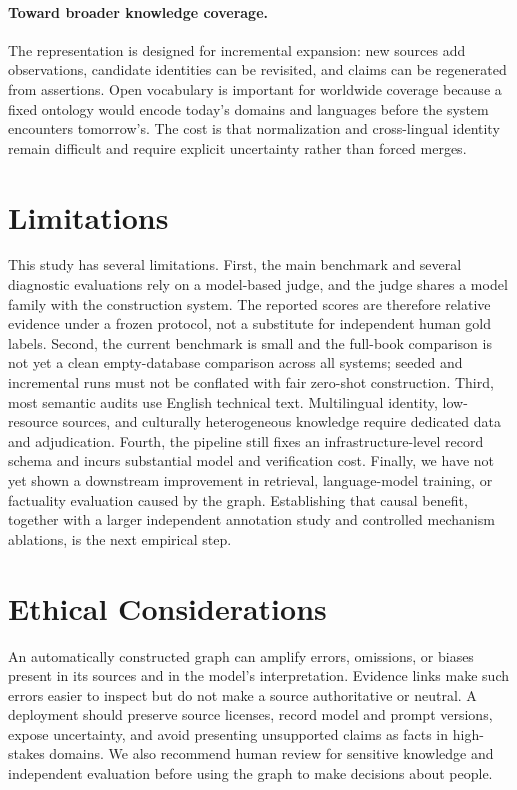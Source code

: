 \documentclass[11pt]{article}
\begin{document}
\paragraph{Toward broader knowledge coverage.} The representation is designed for incremental expansion: new sources add observations, candidate identities can be revisited, and claims can be regenerated from assertions. Open vocabulary is important for worldwide coverage because a fixed ontology would encode today's domains and languages before the system encounters tomorrow's. The cost is that normalization and cross-lingual identity remain difficult and require explicit uncertainty rather than forced merges.

\section{Limitations}
\label{sec:limitations}

This study has several limitations. First, the main benchmark and several diagnostic evaluations rely on a model-based judge, and the judge shares a model family with the construction system. The reported scores are therefore relative evidence under a frozen protocol, not a substitute for independent human gold labels. Second, the current benchmark is small and the full-book comparison is not yet a clean empty-database comparison across all systems; seeded and incremental runs must not be conflated with fair zero-shot construction. Third, most semantic audits use English technical text. Multilingual identity, low-resource sources, and culturally heterogeneous knowledge require dedicated data and adjudication. Fourth, the pipeline still fixes an infrastructure-level record schema and incurs substantial model and verification cost. Finally, we have not yet shown a downstream improvement in retrieval, language-model training, or factuality evaluation caused by the graph. Establishing that causal benefit, together with a larger independent annotation study and controlled mechanism ablations, is the next empirical step.

\section*{Ethical Considerations}

An automatically constructed graph can amplify errors, omissions, or biases present in its sources and in the model's interpretation. Evidence links make such errors easier to inspect but do not make a source authoritative or neutral. A deployment should preserve source licenses, record model and prompt versions, expose uncertainty, and avoid presenting unsupported claims as facts in high-stakes domains. We also recommend human review for sensitive knowledge and independent evaluation before using the graph to make decisions about people.
\end{document}
